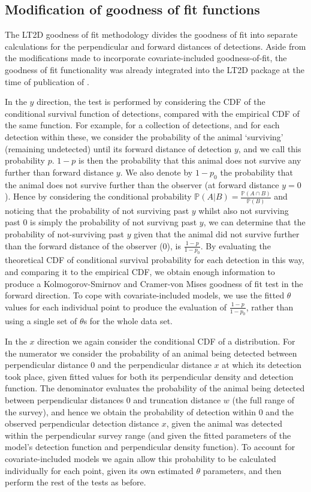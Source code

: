 \documentclass[11pt]{article}
\begin{document}
\begin{multicols}{2}
\subsection{Modification of goodness of fit functions}
The LT2D goodness of fit methodology divides the goodness of fit into separate calculations for the perpendicular and forward distances of detections. Aside from the modifications made to incorporate covariate-included goodness-of-fit, the goodness of fit functionality was already integrated into the LT2D package at the time of publication of \cite{Borchers}.

In the $y$ direction, the test is performed by considering the CDF of the conditional survival function of detections, compared with the empirical CDF of the same function. For example, for a collection of detections, and for each detection within these, we consider the probability of the animal `surviving' (remaining undetected) until its forward distance of detection $y$, and we call this probability $p$. $1-p$ is then the probability that this animal does not survive any further than forward distance $y$. We also denote by $1-p_0$ the probability that the animal does not survive further than the observer (at forward distance $y=0$). Hence by          considering the conditional probability $\mathbb{P}\left(A|B\right) = \frac{\mathbb{P}\left(A\cap B\right)}{\mathbb{P}\left(B\right)}$ and noticing that the probability of not surviving past $y$ whilst also not surviving past $0$ is simply the probability of not survivng past $y$, we can determine that the probability of not-surviving past $y$ given that the animal did not survive further than the forward distance of the observer ($0$), is $\frac{1-p}{1-p_0}$. By evaluating the theoretical CDF of conditional survival probability for each detection in this way, and comparing it to the empirical CDF, we obtain enough information to produce a Kolmogorov-Smirnov and Cramer-von Mises goodness of fit test in the forward direction. To cope with covariate-included models, we use the fitted $\theta$ values for each individual point to produce the evaluation of $\frac{1-p}{1-p_0}$, rather than using a single set of $\theta$s for the whole data set. 

In the $x$ direction we again consider the conditional CDF of a distribution. For the numerator we consider the probability of an animal being detected between perpendicular distance $0$ and the perpendicular distance $x$ at which its detection took place, given fitted values for both its perpendicular density and detection function. The denominator evaluates the probability of the animal being detected between perpendicular distances $0$ and truncation distance $w$ (the full range of the survey), and hence we obtain the probability of detection within $0$ and the observed perpendicular detection distance $x$, given the animal was detected within the perpendicular survey range (and given the fitted parameters of the model's detection function and perpendicular density function). To account for covariate-included models we again allow this probability to be calculated individually for each point, given its own estimated $\theta$ parameters, and then perform the rest of the tests as before.


\end{multicols}
\end{document}
